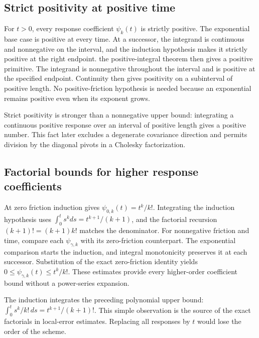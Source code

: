 \documentclass[11pt,a4paper]{report}
\begin{document}
\subsection{\texorpdfstring{Strict positivity at positive time}{Strict positivity at positive time}}
\label{report-step-KineticLangevin-Coefficients-lean-10}


For \(t>0\), every response coefficient \(\psi_k(t)\) is strictly positive. The exponential base case is positive at every time. At a successor, the integrand is continuous and nonnegative on the interval, and the induction hypothesis makes it strictly positive at the right endpoint. the positive-integral theorem then gives a positive primitive. The integrand is nonnegative throughout the interval and is positive at the specified endpoint. Continuity then gives positivity on a subinterval of positive length. No positive-friction hypothesis is needed because an exponential remains positive even when its exponent grows.



Strict positivity is stronger than a nonnegative upper bound: integrating a continuous positive response over an interval of positive length gives a positive number. This fact later excludes a degenerate covariance direction and permits division by the diagonal pivots in a Cholesky factorization.

\subsection{\texorpdfstring{Factorial bounds for higher response coefficients}{Factorial bounds for higher response coefficients}}
\label{report-step-KineticLangevin-Coefficients-lean-11}


At zero friction induction gives \(\psi_{0,k}(t)=t^k/k!\). Integrating the induction hypothesis uses \(\int_0^ts^kds=t^{k+1}/(k+1)\), and the factorial recursion \((k+1)!=(k+1)k!\) matches the denominator. For nonnegative friction and time, compare each \(\psi_{\gamma,k}\) with its zero-friction counterpart. The exponential comparison starts the induction, and integral monotonicity preserves it at each successor. Substitution of the exact zero-friction identity yields \(0\le\psi_{\gamma,k}(t)\le t^k/k!\). These estimates provide every higher-order coefficient bound without a power-series expansion.



The induction integrates the preceding polynomial upper bound: \(\int_0^t s^k/k!\,ds=t^{k+1}/(k+1)!\). This simple observation is the source of the exact factorials in local-error estimates. Replacing all responses by \(t\) would lose the order of the scheme.
\end{document}
